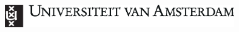 \documentclass[../main.tex]{subfiles}
\begin{document}
\begin{titlepage}



	\includegraphics[width=10cm]{uvalogo_regular_p_nl.eps}




	\vfill %

\end{titlepage}
\end{document}
